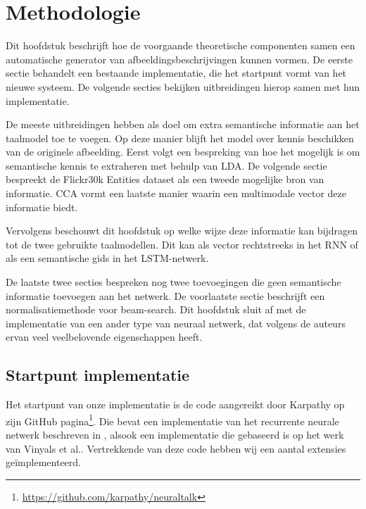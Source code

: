 \chapter{Methodologie}

Dit hoofdstuk beschrijft hoe de voorgaande theoretische componenten samen een automatische generator van afbeeldingsbeschrijvingen kunnen vormen. De eerste sectie behandelt een bestaande implementatie, die het startpunt vormt van het nieuwe systeem. De volgende secties bekijken uitbreidingen hierop samen met hun implementatie. 

De meeste uitbreidingen hebben als doel om extra semantische informatie aan het taalmodel toe te voegen. Op deze manier blijft het model over kennis beschikken van de originele afbeelding. Eerst volgt een bespreking van hoe het mogelijk is om semantische kennis te extraheren met behulp van LDA. De volgende sectie bespreekt de Flickr30k Entities dataset als een tweede mogelijke bron van informatie. CCA vormt een laatste manier waarin een multimodale vector deze informatie biedt.

Vervolgens beschouwt dit hoofdstuk op welke wijze deze informatie kan bijdragen tot de twee gebruikte taalmodellen. Dit kan als vector rechtstreeks in het RNN of als een semantische gids in het LSTM-netwerk. 

De laatste twee secties bespreken nog twee toevoegingen die geen semantische informatie toevoegen aan het netwerk. De voorlaatste sectie beschrijft een normalisatiemethode voor beam-search. Dit hoofdstuk sluit af met de implementatie van een ander type van neuraal netwerk, dat volgens de auteurs ervan veel veelbelovende eigenschappen heeft.


\section{Startpunt implementatie} 
Het startpunt van onze implementatie is de code aangereikt door Karpathy op zijn GitHub pagina\footnote{\url{https://github.com/karpathy/neuraltalk}}. Die bevat een implementatie van het recurrente neurale netwerk beschreven in \cite{Karpathy2015}, alsook een implementatie die gebaseerd is op het werk van Vinyals et al.\cite{Google}. Vertrekkende van deze code hebben wij een aantal extensies ge\"implementeerd. 

